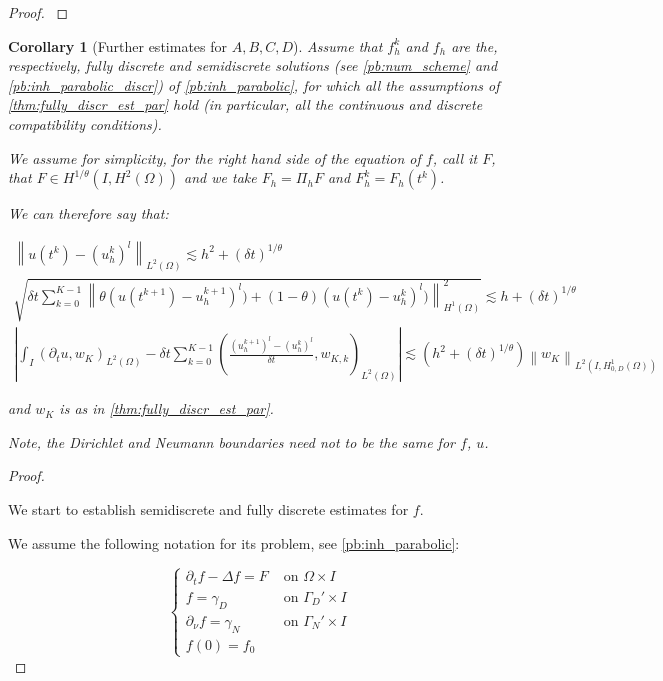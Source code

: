 \documentclass[english,a4paper,9pt,oneside]{scrbook}	%
\theoremstyle{break}
\newtheorem{cor}[equation]{Corollary}
\newenvironment{mproof}[1][\proofname]{%
  \begin{proof}[#1]$ $\par\nobreak\ignorespaces
}{%
  \end{proof}
}
\renewcommand*{\proofname}{Proof}
\theoremstyle{remark}
\newcommand{\norm}[1]{\left\lVert#1\right\rVert}
\begin{document}
\begin{appendices}
\begin{mproof}
\end{mproof}


\begin{cor}[Further estimates for $A,B,C,D$]
\label{cor:actual_par_est}
Assume that $f_h^k$ and $f_h$ are the, respectively, fully discrete and semidiscrete solutions (see \cref{pb:num_scheme} and  \cref{pb:inh_parabolic_discr}) of \cref{pb:inh_parabolic}, for which all the assumptions of \cref{thm:fully_discr_est_par} hold (in particular, all the continuous and discrete compatibility conditions).

We assume for simplicity, for the right hand side of the equation of $f$, call it $F$, that $F \in H^{1/\theta}(I,H^2(\Omega))$ and we take $F_h = \Pi_h F$ and $F_h^k=F_h(t^k)$.

We can therefore say that:

\begin{align*}
	\norm{u(t^k)-(u_h^k)^l}_{L^2(\Omega)}\lesssim  h^2 + (\delta t)^{1/\theta}\\
	\sqrt{\delta t \sum_{k=0}^{K-1} \norm{\theta(u(t^{k+1}) - u_h^{k+1})^l) + (1-\theta)(u(t^{k}) - u_h^{k})^l)}_{H^1(\Omega)}^2} \lesssim h + (\delta t)^{1/\theta}\\
	\left | \int_I (\partial_t u , w_K)_{L^2(\Omega)}-\delta t \sum_{k=0}^{K-1}\left ( \frac{(u^{k+1}_h)^l - (u_h^k)^l}{\delta t} , w_{K,k}\right )_{L^2(\Omega)} \right |\lesssim \left ( h^2 + (\delta t)^{1/\theta} \right ) \norm{w_K}_{L^2(I,H^1_{0,D}(\Omega))}
\end{align*}

and $w_K$ is as in \cref{thm:fully_discr_est_par}.

Note, the Dirichlet and Neumann boundaries need not to be the same for $f$, $u$.

\end{cor}


\begin{mproof}

We start to establish semidiscrete and fully discrete estimates for $f$.

We assume the following notation for its problem, see \cref{pb:inh_parabolic}:

$$
\left\{\begin{matrix}
\partial_t f-\Delta f = F & \text{ on } \Omega \times I \\ 
f = \gamma_D & \text{ on } \Gamma_D' \times I\\ 
\partial_\nu f = \gamma_N & \text{ on } \Gamma_N' \times I \\
f(0) =  f_0
\end{matrix}\right.
$$


\end{mproof}
\end{appendices}
\end{document}
